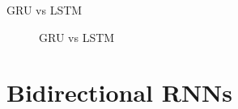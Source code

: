 \begin{vbframe}{GRU vs LSTM}
  \begin{figure}
     \centering
      \caption{\footnotesize{GRU vs LSTM}}
  \end{figure}

\end{vbframe}

\section{Bidirectional RNNs}


